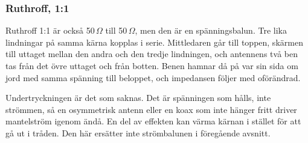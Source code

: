 \subsubsection{Ruthroff, 1:1}
\label{sec:ruthroff-11}

Ruthroff 1:1 är också 50\,$\Omega$ till 50\,$\Omega$, men den är en
spänningsbalun. Tre lika lindningar på samma kärna kopplas i serie.
Mittledaren går till toppen, skärmen till uttaget mellan den andra och
den tredje lindningen, och antennens två ben tas från det övre uttaget
och från botten. Benen hamnar då på var sin sida om jord med samma
spänning till beloppet, och impedansen följer med oförändrad.

Undertryckningen är det som saknas. Det är spänningen som hålls, inte
strömmen, så en osymmetrisk antenn eller en koax som inte hänger fritt
driver mantelström igenom ändå. En del av effekten kan värma kärnan i
stället för att gå ut i tråden. Den här ersätter inte strömbalunen i
föregående avsnitt.

